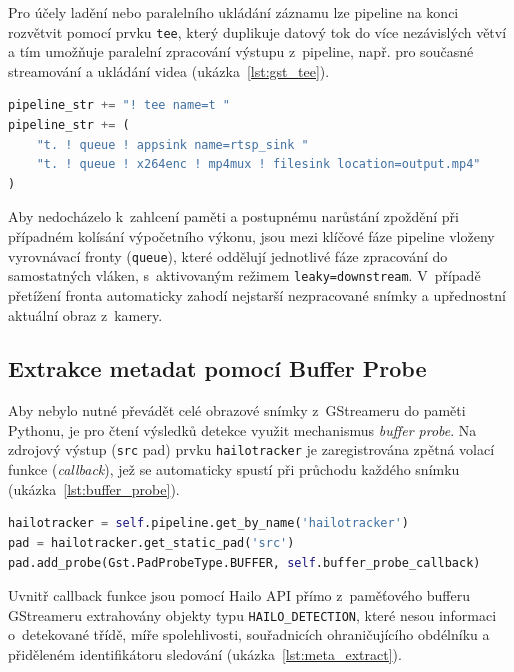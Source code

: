 Pro účely ladění nebo paralelního ukládání záznamu lze pipeline na konci rozvětvit pomocí prvku \texttt{tee}, který duplikuje datový tok do více nezávislých větví a tím umožňuje paralelní zpracování výstupu z~pipeline, např. pro současné streamování a ukládání videa (ukázka~\ref{lst:gst_tee}).
\newpage

\begin{lstlisting}[language=Python, caption={Větvení výstupu pipeline pomocí prvku tee.}, label={lst:gst_tee}]
pipeline_str += "! tee name=t "
pipeline_str += (
    "t. ! queue ! appsink name=rtsp_sink "
    "t. ! queue ! x264enc ! mp4mux ! filesink location=output.mp4"
)
\end{lstlisting}

Aby nedocházelo k~zahlcení paměti a postupnému narůstání zpoždění při případném kolísání výpočetního výkonu, jsou mezi klíčové fáze pipeline vloženy vyrovnávací fronty (\texttt{queue}), které oddělují jednotlivé fáze zpracování do samostatných vláken, s~aktivovaným režimem \texttt{leaky=downstream}. V~případě přetížení fronta automaticky zahodí nejstarší nezpracované snímky a upřednostní aktuální obraz z~kamery.

\subsection{Extrakce metadat pomocí Buffer Probe}
Aby nebylo nutné převádět celé obrazové snímky z~GStreameru do paměti Pythonu, je pro čtení výsledků detekce využit mechanismus \textit{buffer probe}. Na zdrojový výstup (\texttt{src} pad) prvku \texttt{hailotracker} je zaregistrována zpětná volací funkce (\textit{callback}), jež se automaticky spustí při průchodu každého snímku (ukázka~\ref{lst:buffer_probe}).

\begin{lstlisting}[language=Python, caption={Registrace buffer probe na výstupu sledovacího modulu.}, label={lst:buffer_probe}]
hailotracker = self.pipeline.get_by_name('hailotracker')
pad = hailotracker.get_static_pad('src')
pad.add_probe(Gst.PadProbeType.BUFFER, self.buffer_probe_callback)
\end{lstlisting}

Uvnitř callback funkce jsou pomocí Hailo API přímo z~paměťového bufferu GStreameru extrahovány objekty typu \texttt{HAILO\_DETECTION}, které nesou informaci o~detekované třídě, míře spolehlivosti, souřadnicích ohraničujícího obdélníku a přiděleném identifikátoru sledování (ukázka~\ref{lst:meta_extract}).

